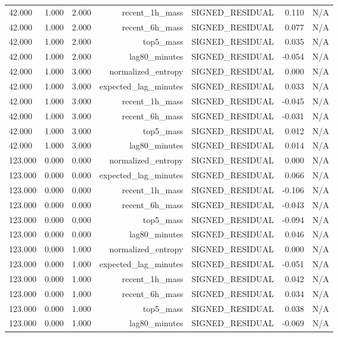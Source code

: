 \begin{table}[h!]
\begin{tabular}{lrrrrrr}
42.000 & 1.000 & 2.000 & recent\_1h\_mass & SIGNED\_RESIDUAL & 0.110 & N/A \\
42.000 & 1.000 & 2.000 & recent\_6h\_mass & SIGNED\_RESIDUAL & 0.077 & N/A \\
42.000 & 1.000 & 2.000 & top5\_mass & SIGNED\_RESIDUAL & 0.035 & N/A \\
42.000 & 1.000 & 2.000 & lag80\_minutes & SIGNED\_RESIDUAL & -0.054 & N/A \\
42.000 & 1.000 & 3.000 & normalized\_entropy & SIGNED\_RESIDUAL & 0.000 & N/A \\
42.000 & 1.000 & 3.000 & expected\_lag\_minutes & SIGNED\_RESIDUAL & 0.033 & N/A \\
42.000 & 1.000 & 3.000 & recent\_1h\_mass & SIGNED\_RESIDUAL & -0.045 & N/A \\
42.000 & 1.000 & 3.000 & recent\_6h\_mass & SIGNED\_RESIDUAL & -0.031 & N/A \\
42.000 & 1.000 & 3.000 & top5\_mass & SIGNED\_RESIDUAL & 0.012 & N/A \\
42.000 & 1.000 & 3.000 & lag80\_minutes & SIGNED\_RESIDUAL & 0.014 & N/A \\
123.000 & 0.000 & 0.000 & normalized\_entropy & SIGNED\_RESIDUAL & 0.000 & N/A \\
123.000 & 0.000 & 0.000 & expected\_lag\_minutes & SIGNED\_RESIDUAL & 0.066 & N/A \\
123.000 & 0.000 & 0.000 & recent\_1h\_mass & SIGNED\_RESIDUAL & -0.106 & N/A \\
123.000 & 0.000 & 0.000 & recent\_6h\_mass & SIGNED\_RESIDUAL & -0.043 & N/A \\
123.000 & 0.000 & 0.000 & top5\_mass & SIGNED\_RESIDUAL & -0.094 & N/A \\
123.000 & 0.000 & 0.000 & lag80\_minutes & SIGNED\_RESIDUAL & 0.046 & N/A \\
123.000 & 0.000 & 1.000 & normalized\_entropy & SIGNED\_RESIDUAL & 0.000 & N/A \\
123.000 & 0.000 & 1.000 & expected\_lag\_minutes & SIGNED\_RESIDUAL & -0.051 & N/A \\
123.000 & 0.000 & 1.000 & recent\_1h\_mass & SIGNED\_RESIDUAL & 0.042 & N/A \\
123.000 & 0.000 & 1.000 & recent\_6h\_mass & SIGNED\_RESIDUAL & 0.034 & N/A \\
123.000 & 0.000 & 1.000 & top5\_mass & SIGNED\_RESIDUAL & 0.038 & N/A \\
123.000 & 0.000 & 1.000 & lag80\_minutes & SIGNED\_RESIDUAL & -0.069 & N/A \\

\end{tabular}
\end{table}

